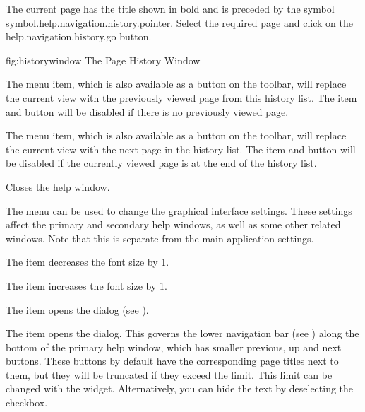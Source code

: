 The current page has the title shown in bold and is preceded by
the symbol \gls{symbol.help.navigation.history.pointer}.
Select the required page and click on the
\gls{help.navigation.history.go} button.

\FloatFig
 {fig:historywindow}
 {%
 }
 {The Page History Window}


The  menu item, which is
also available as a button on the toolbar, will replace the current
view with the previously viewed page from this history list. The
item and button will be disabled if there is no previously viewed
page. 


The  menu item, which is
also available as a button on the toolbar, will replace the current view with the
next page in the history list. The item and button will be disabled if the
currently viewed page is at the end of the history list. 


Closes the help window.


The  menu can be used to change the
graphical interface settings. These settings affect the primary and
secondary help windows, as well as some other related windows.
Note that this is separate from the main application settings.


The  item decreases the font
size by 1.


The  item increases the font
size by 1.


The  item opens the
 dialog (see
).


The  item opens the
 dialog. This governs the
lower navigation bar (see ) along the
bottom of the primary help window, which has smaller previous, up and next
buttons.  These buttons by default have the corresponding page
titles next to them, but they will be truncated if they exceed the
limit. This limit can be changed with the
 widget. Alternatively, you
can hide the text by deselecting the
 checkbox.

